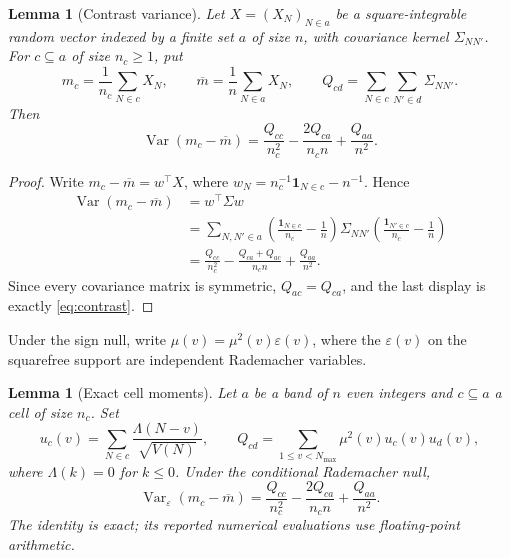 \documentclass[11pt,a4paper]{article}
\theoremstyle{plain}
\newtheorem{lemma}[theorem]{Lemma}
\theoremstyle{definition}
\theoremstyle{remark}
\begin{document}
\begin{lemma}[Contrast variance]\label{lem:contrast}
Let $X=(X_N)_{N\in a}$ be a square-integrable random vector indexed by
a finite set $a$ of size $n$, with covariance kernel
$\Sigma_{NN'}$.  For $c\subseteq a$ of size $n_c\geq1$, put
\[
 m_c=\frac1{n_c}\sum_{N\in c}X_N,\qquad
 \overline m=\frac1n\sum_{N\in a}X_N,\qquad
 Q_{cd}=\sum_{N\in c}\sum_{N'\in d}\Sigma_{NN'}.
\]
Then
\begin{equation}\label{eq:contrast}
 \operatorname{Var}(m_c-\overline m)
 =\frac{Q_{cc}}{n_c^2}-\frac{2Q_{ca}}{n_cn}+\frac{Q_{aa}}{n^2}.
\end{equation}
\end{lemma}

\begin{proof}
Write $m_c-\overline m=w^{\top}X$, where
$w_N=n_c^{-1}\mathbf 1_{N\in c}-n^{-1}$.  Hence
\[
\begin{aligned}
 \operatorname{Var}(m_c-\overline m)
 &=w^{\top}\Sigma w\\
 &=\sum_{N,N'\in a}
   \left(\frac{\mathbf1_{N\in c}}{n_c}-\frac1n\right)
   \Sigma_{NN'}
   \left(\frac{\mathbf1_{N'\in c}}{n_c}-\frac1n\right)\\
 &=\frac{Q_{cc}}{n_c^2}
   -\frac{Q_{ca}+Q_{ac}}{n_cn}
   +\frac{Q_{aa}}{n^2}.
\end{aligned}
\]
Since every covariance matrix is symmetric, $Q_{ac}=Q_{ca}$, and the
last display is exactly \eqref{eq:contrast}.
\end{proof}

Under the sign null, write
$\mu(v)=\mu^2(v)\varepsilon(v)$, where the $\varepsilon(v)$ on the
squarefree support are independent Rademacher variables.

\begin{lemma}[Exact cell moments]\label{lem:cellmom}
Let $a$ be a band of $n$ even integers and $c\subseteq a$ a cell of
size $n_c$.  Set
\[
 u_c(v)=\sum_{N\in c}\frac{\Lambda(N-v)}{\sqrt{V(N)}},
 \qquad
 Q_{cd}=\sum_{1\leq v<N_{\max}}\mu^2(v)u_c(v)u_d(v),
\]
where $\Lambda(k)=0$ for $k\leq0$.  Under the conditional Rademacher
null,
\begin{equation}\label{eq:cellmom}
 \operatorname{Var}_{\varepsilon}(m_c-\overline m)
 =\frac{Q_{cc}}{n_c^2}-\frac{2Q_{ca}}{n_cn}+\frac{Q_{aa}}{n^2}.
\end{equation}
The identity is exact; its reported numerical evaluations use
floating-point arithmetic.
\end{lemma}
\end{document}

